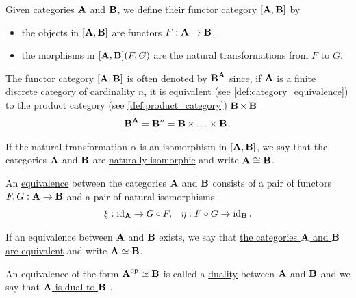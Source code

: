 \begin{definition}\label{def:functor_category}
  Given categories $\operatorname{\mathbf{A}}$ and $\operatorname{\mathbf{B}}$, we define their \uline{functor category} $[\operatorname{\mathbf{A}}, \operatorname{\mathbf{B}}]$ by
  \begin{itemize}
    \item the objects in $[\operatorname{\mathbf{A}}, \operatorname{\mathbf{B}}]$ are functors $F: \operatorname{\mathbf{A}} \to \operatorname{\mathbf{B}}$.
    \item the morphisms in $[\operatorname{\mathbf{A}}, \operatorname{\mathbf{B}}](F, G)$ are the natural transformations from $F$ to $G$.
  \end{itemize}

  The functor category $[\operatorname{\mathbf{A}}, \operatorname{\mathbf{B}}]$ is often denoted by ${\operatorname{\mathbf{B}}}^{\operatorname{\mathbf{A}}}$ since, if $\operatorname{\mathbf{A}}$ is a finite discrete category of cardinality $n$, it is equivalent (see \cref{def:category_equivalence}) to the product category (see \cref{def:product_category}) $\operatorname{\mathbf{B}} \times \operatorname{\mathbf{B}}$
  \begin{align*}
    {\operatorname{\mathbf{B}}}^{\operatorname{\mathbf{A}}} = {\operatorname{\mathbf{B}}}^n = \operatorname{\mathbf{B}} \times \ldots \times \operatorname{\mathbf{B}}.
  \end{align*}

  If the natural transformation $\alpha$ is an isomorphism in $[\operatorname{\mathbf{A}}, \operatorname{\mathbf{B}}]$, we say that the categories $\operatorname{\mathbf{A}}$ and $\operatorname{\mathbf{B}}$ are \uline{naturally isomorphic} and write $\operatorname{\mathbf{A}} \cong \operatorname{\mathbf{B}}$.
\end{definition}

\begin{definition}\label{def:category_equivalence}\cite[definition 1.3.15]{Leinster2014}
  An \uline{equivalence} between the categories $\operatorname{\mathbf{A}}$ and $\operatorname{\mathbf{B}}$ consists of a pair of functors $F, G: \operatorname{\mathbf{A}} \to \operatorname{\mathbf{B}}$ and a pair of natural isomorphisms
  \begin{align*}
    \xi: \operatorname{id}_{\operatorname{\mathbf{A}}} \to G \circ F,
    &&
    \eta: F \circ G \to \operatorname{id}_{\operatorname{\mathbf{B}}}.
  \end{align*}

  If an equivalence between $\operatorname{\mathbf{A}}$ and $\operatorname{\mathbf{B}}$ exists, we say that \uline{the categories $\operatorname{\mathbf{A}}$ and $\operatorname{\mathbf{B}}$ are equivalent} and write $\operatorname{\mathbf{A}} \simeq \operatorname{\mathbf{B}}$.

  An equivalence of the form $\operatorname{\mathbf{A}}^{\operatorname{op}} \simeq \operatorname{\mathbf{B}}$ is called a \uline{duality} between $\operatorname{\mathbf{A}}$ and $\operatorname{\mathbf{B}}$ and we say that \uline{$\operatorname{\mathbf{A}}$ is dual to $\operatorname{\mathbf{B}}$} \cite[example 1.3.22]{Leinster2014}.
\end{definition}


